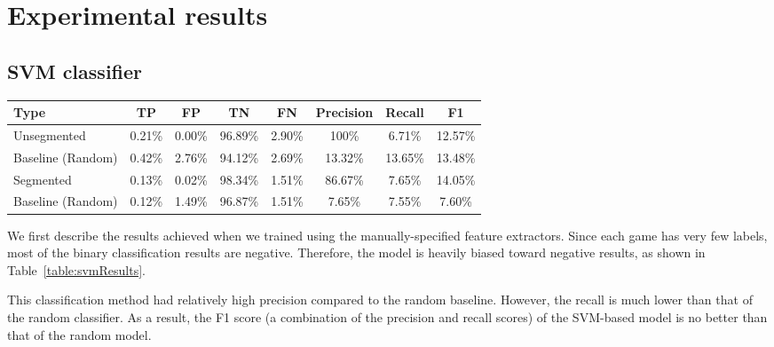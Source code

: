 \documentclass[11pt]{article}
\begin{document}
\section{Experimental results}
\subsection{SVM classifier}
\begin{table*}
\centering
\begin{tabular}{lccccccc}
\hline
\textbf{Type} & \textbf{TP} & \textbf{FP} & \textbf{TN} & \textbf{FN} & 
\textbf{Precision} & \textbf{Recall} & \textbf{F1} \\ \hline
Unsegmented & 0.21\% & 0.00\% & 96.89\% & 2.90\% & 100\% & 6.71\% & 
12.57\% \\
Baseline (Random) & 0.42\% & 2.76\% & 94.12\% & 2.69\% & 13.32\% & 
13.65\% & 13.48\% \\
\hline
Segmented & 0.13\% & 0.02\% & 98.34\% & 1.51\% & 86.67\% & 7.65\% & 
14.05\% \\
Baseline (Random) & 0.12\% & 1.49\% & 96.87\% & 1.51\% & 7.65\% & 7.55\% 
& 7.60\% \\ \hline
\end{tabular} 
\caption{Classification results for the games that have not been 
segmented by the color of the active player, and those that have been. 
In the former, precision clearly outperforms a random baseline, but 
recall falls short, resulting in a lower F1 score. In the latter, 
precision has fallen relative to the unsegmented version, but recall has 
risen, resulting in a slightly higher F1 score. In contrast, the random 
model became much worse in both ways.}
\label{table:svmResults}
\end{table*}

We first describe the results achieved when we trained using the 
manually-specified feature extractors. Since each game has very few 
labels, most of the binary classification results are negative. 
Therefore, the model is heavily biased toward negative results, as shown 
in Table~\ref{table:svmResults}.

This classification method had relatively high precision compared to the 
random baseline. However, the recall is much lower than that of the 
random classifier. As a result, the F1 score (a combination of the 
precision and recall scores) of the SVM-based model is no better than 
that of the random model.
\end{document}

